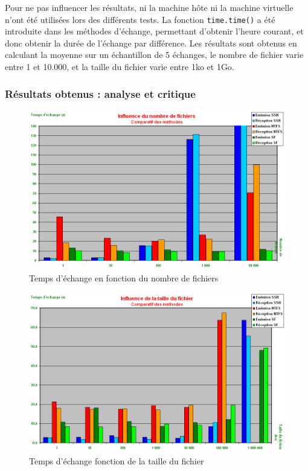 Pour ne pas influencer les résultats, ni la machine hôte ni la machine virtuelle n'ont été utilisées lors des différents tests.
La fonction \lstinline{time.time()} a été introduite dans les méthodes d'échange, permettant d'obtenir l'heure courant, et donc obtenir la durée de l'échange par différence.
Les résultats sont obtenus en calculant la moyenne sur un échantillon de 5 échanges, le nombre de fichier varie entre 1 et 10.000, et la taille du fichier varie entre 1ko et 1Go.
\\




\subsubsection{Résultats obtenus : analyse et critique}

\begin{figure}[!h]
	\center
	\includegraphics[scale=0.45]{images/tests/nombre_comparatif.png}
	\caption{Temps d'échange en fonction du nombre de fichiers}
	\label{temps=f(nombre) - comparatif}
\end{figure}

\begin{figure}[!h]
	\center
	\includegraphics[scale=0.45]{images/tests/taille_comparatif.png}
	\caption{Temps d'échange fonction de la taille du fichier}
	\label{temps=f(taille) - comparatif}
\end{figure}

